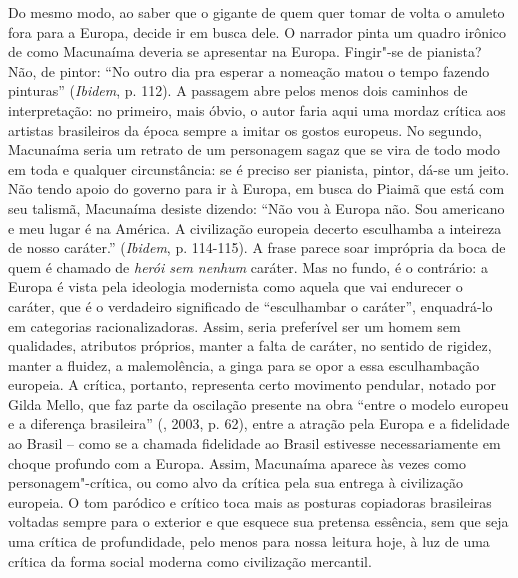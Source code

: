 {Do mesmo modo, ao saber que o gigante de quem quer tomar de volta o
amuleto fora para a Europa, decide ir em busca dele. O narrador pinta um
quadro irônico de como Macunaíma deveria se apresentar na Europa.
Fingir"-se de pianista? Não, de pintor: ``No outro dia pra esperar a
nomeação matou o tempo fazendo pinturas'' (\emph{Ibidem}, p. 112). A
passagem abre pelos menos dois caminhos de interpretação: no primeiro,
mais óbvio, o autor faria aqui uma mordaz crítica aos artistas
brasileiros da época sempre a imitar os gostos europeus. No segundo,
Macunaíma seria um retrato de um personagem sagaz que se vira de todo
modo em toda e qualquer circunstância: se é preciso ser pianista,
pintor, dá-se um jeito. Não tendo apoio do governo para ir à Europa, em
busca do Piaimã que está com seu talismã, Macunaíma desiste dizendo:
``Não vou à Europa não. Sou americano e meu lugar é na América. A
civilização europeia decerto esculhamba a inteireza de nosso caráter.''
(\emph{Ibidem}, p. 114-115). A frase parece soar imprópria da boca de
quem é chamado de \emph{herói sem nenhum} caráter. Mas no fundo, é o
contrário: a Europa é vista pela ideologia modernista como aquela que
vai endurecer o caráter, que é o verdadeiro significado de ``esculhambar
o caráter'', enquadrá-lo em categorias racionalizadoras. Assim, seria
preferível ser um homem sem qualidades, atributos próprios, manter a
falta de caráter, no sentido de rigidez, manter a
fluidez, a malemolência, a ginga para se opor a essa esculhambação
europeia. A crítica, portanto, representa certo movimento pendular,
notado por Gilda Mello, que faz parte da oscilação presente na obra
``entre o modelo europeu e a diferença brasileira'' (, 2003, p.
62), entre a atração pela Europa e a fidelidade ao Brasil -- como se a
chamada fidelidade ao Brasil estivesse necessariamente em choque
profundo com a Europa. Assim, Macunaíma aparece às vezes como
personagem"-crítica, ou como alvo da crítica pela sua entrega à
civilização europeia. O tom paródico e crítico toca mais as posturas
copiadoras brasileiras voltadas sempre para o exterior e que esquece sua
pretensa essência, sem que seja uma crítica de profundidade, pelo menos
para nossa leitura hoje, à luz de uma crítica da forma social moderna
como civilização mercantil.

}
